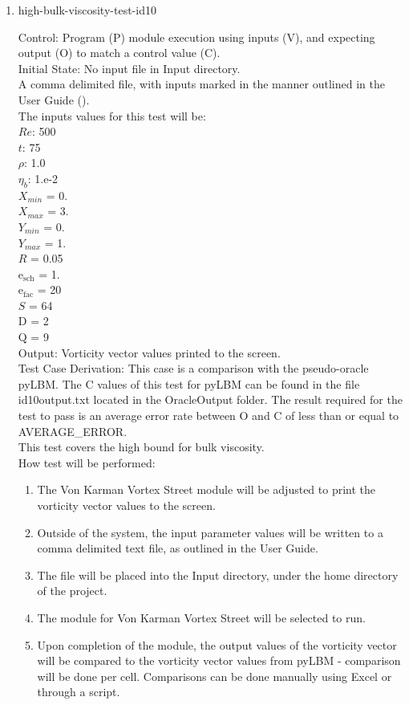 \documentclass[12pt, titlepage]{article}
\begin{document}
\begin{enumerate}
\item{high-bulk-viscosity-test-id10\\}

Control: Program (P) module execution using inputs (V), and expecting output (O) to match a control value (C).\\
					
Initial State: No input file in Input directory.\\
					
A comma delimited file, with inputs marked in the manner outlined in the User Guide (\citet{LBM_UserGuide_PM}).\\The inputs values for this test will be:\\
$Re$: 500\\
$t$: 75\\
$\rho$: 1.0\\
$\eta_b$: 1.e-2\\
$X_{min}$ = 0.\\
$X_{max}$ = 3.\\
$Y_{min}$ = 0.\\
$Y_{max}$ = 1.\\
$R$ = 0.05\\
$\mathrm{e_{sch}}$ = 1.\\
$\mathrm{e_{fac}}$ = 20\\
$S$ = 64\\
$\mathrm{D}$ = 2\\
$\mathrm{Q}$ = 9\\

Output: Vorticity vector values printed to the screen. \\ 

Test Case Derivation: This case is a comparison with the pseudo-oracle pyLBM. The C values of this test for pyLBM can be found in the file id10output.txt located in the OracleOutput folder. The result required for the test to pass is an average error rate between O and C of less than or equal to AVERAGE\_ERROR.\\
This test covers the high bound for bulk viscosity.\\

					
How test will be performed: 

\begin{enumerate}
\item The Von Karman Vortex Street module will be adjusted to print the vorticity vector values to the screen.
\item Outside of the system, the input parameter values will be written to a comma delimited text file, as outlined in the User Guide.
\item The file will be placed into the Input directory, under the home directory of the project.
\item The module for Von Karman Vortex Street will be selected to run.
\item Upon completion of the module, the output values of the vorticity vector will be compared to the vorticity vector values from pyLBM - comparison will be done per cell. Comparisons can be done manually using Excel or through a script.\\
\end{enumerate}

\end{enumerate}
\end{document}

